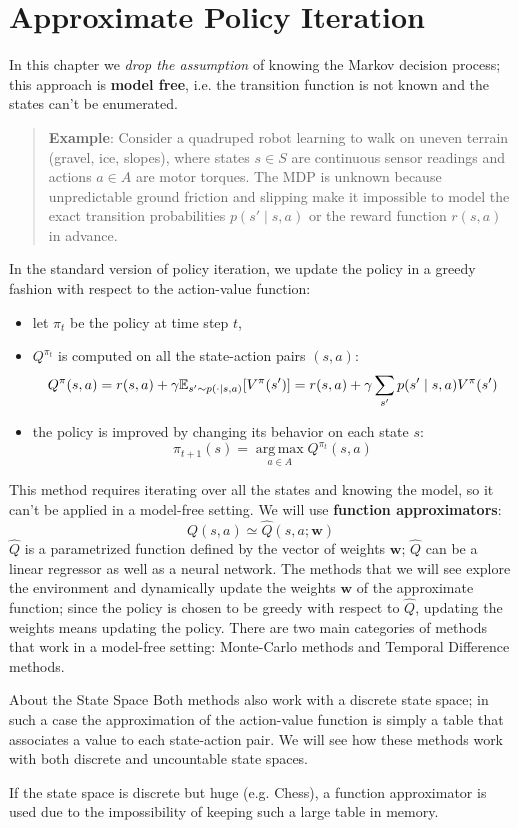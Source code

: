 \documentclass[10pt, a4paper]{report}
\begin{document}
\chapter{Approximate Policy Iteration}\label{chap:API}
In this chapter we \textit{drop the assumption} of knowing the Markov decision process; this approach is \textbf{model free}, i.e. the transition function is not known and the states can't be enumerated.
\begin{quote}
    \textbf{Example}: Consider a quadruped robot learning to walk on uneven terrain (gravel, ice, slopes), where states $s \in S$ are continuous sensor readings and actions $a \in A$ are motor torques. The MDP is unknown because unpredictable ground friction and slipping make it impossible to model the exact transition probabilities $p(s' \mid s, a)$ or the reward function $r(s, a)$ in advance.
\end{quote}
In the standard version of policy iteration, we update the policy in a greedy fashion with respect to the action-value function:
\begin{itemize}
    \item let $\pi_t$ be the policy at time step $t$,
    \item $Q^{\pi_t}$ is computed on all the state-action pairs $(s,a)$:
    \begin{equation}
        Q^\pi(s,a)=r(s,a)+\gamma{\mathbb E}_{s'\sim p(\cdot\mid s,a)}[V^\pi(s')]=
        r(s,a)+\gamma\sum_{s'}p(s'\mid s,a)V^\pi(s')
    \end{equation}
    \item the policy is improved by changing its behavior on each state $s$:
    \begin{equation}
        \pi_{t+1}(s)=\operatorname*{arg\,max}_{a\in A}Q^{\pi_t}(s,a)
    \end{equation}
\end{itemize}
This method requires iterating over all the states and knowing the model, so it can't be applied in a model-free setting. We will use \textbf{function approximators}:
\begin{equation}
    \boxed{Q(s,a)\simeq \hat Q(s,a;\mathbf w)}
\end{equation}
$\hat Q$ is a parametrized function defined by the vector of weights $\mathbf w$; $\hat Q$ can be a linear regressor as well as a neural network. The methods that we will see explore the environment and dynamically update the weights $\mathbf w$ of the approximate function; since the policy is chosen to be greedy with respect to $\hat Q$, updating the weights means updating the policy. There are two main categories of methods that work in a model-free setting: Monte-Carlo methods and Temporal Difference methods.
\begin{boxobservation}{About the State Space}{}
    Both methods also work with a discrete state space; in such a case the approximation of the action-value function is simply a table that associates a value to each state-action pair. We will see how these methods work with both discrete and uncountable state spaces.
\end{boxobservation}
If the state space is discrete but huge (e.g. Chess), a function approximator is used due to the impossibility of keeping such a large table in memory.
\end{document}
